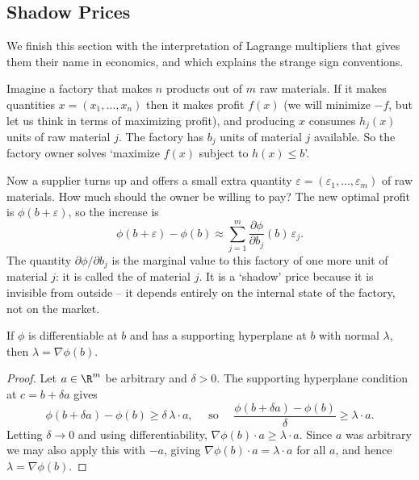 \documentclass[a4paper]{scrartcl}
\begin{document}
\subsection{Shadow Prices}

We finish this section with the interpretation of Lagrange multipliers that gives them their name in economics, and which explains the strange sign conventions.

Imagine a factory that makes $n$ products out of $m$ raw materials. If it makes quantities $x = (x_1, \dots, x_n)$ then it makes profit $f(x)$ (we will minimize $-f$, but let us think in terms of maximizing profit), and producing $x$ consumes $h_j(x)$ units of raw material $j$. The factory has $b_j$ units of material $j$ available. So the factory owner solves `maximize $f(x)$ subject to $h(x) \leq b$'.

Now a supplier turns up and offers a small extra quantity $\varepsilon = (\varepsilon_1, \dots, \varepsilon_m)$ of raw materials. How much should the owner be willing to pay? The new optimal profit is $\phi(b + \varepsilon)$, so the increase is
$$
\phi(b + \varepsilon) - \phi(b) \approx \sum_{j = 1}^m\frac{\partial\phi}{\partial b_j}(b)\,\varepsilon_j.
$$
The quantity $\partial\phi/\partial b_j$ is the marginal value to this factory of one more unit of material $j$: it is called the  of material $j$. It is a `shadow' price because it is invisible from outside -- it depends entirely on the internal state of the factory, not on the market.

\begin{theorem}
    If $\phi$ is differentiable at $b$ and has a supporting hyperplane at $b$ with normal $\lambda$, then $\lambda = \nabla\phi(b)$.
\end{theorem}
\begin{proof}
    Let $a \in \R^m$ be arbitrary and $\delta > 0$. The supporting hyperplane condition at $c = b + \delta a$ gives
    $$
    \phi(b + \delta a) - \phi(b) \geq \delta\, \lambda\cdot a, \quad\text{ so }\quad \frac{\phi(b + \delta a) - \phi(b)}{\delta} \geq \lambda\cdot a.
    $$
    Letting $\delta \rightarrow 0$ and using differentiability, $\nabla\phi(b)\cdot a \geq \lambda\cdot a$. Since $a$ was arbitrary we may also apply this with $-a$, giving $\nabla\phi(b)\cdot a = \lambda\cdot a$ for all $a$, and hence $\lambda = \nabla\phi(b)$.
\end{proof}
\end{document}
